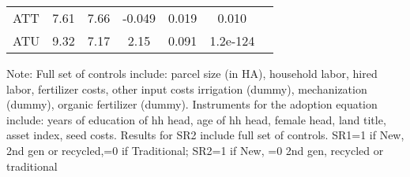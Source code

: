 \begin{table}[H]
\begin{threeparttable}
\begin{tabular}{l cccccc}
ATT         &        7.61&        7.66&      -0.049&       0.019&       0.010\\
%
%
%
ATU         &        9.32&        7.17&        2.15&       0.091&    1.2e-124\\
\hline
\hline
\end{tabular}
\begin{tablenotes}
\footnotesize
\item{Note: Full set of controls include: parcel size (in HA), household labor, hired labor, fertilizer costs, other input costs irrigation (dummy), mechanization (dummy), organic fertilizer (dummy). Instruments for the adoption equation include: years of education of hh head, age of hh head, female head, land title, asset index, seed costs. Results for SR2 include full set of controls. SR1=1 if New, 2nd gen or recycled,=0 if Traditional; SR2=1 if New, =0 2nd gen, recycled or traditional}
\end{tablenotes}
\end{threeparttable}
\end{table}
